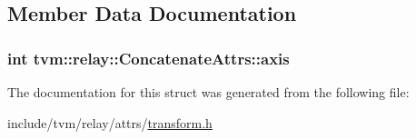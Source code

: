 \subsection{Member Data Documentation}
\subsubsection[{\texorpdfstring{axis}{axis}}]{\setlength{\rightskip}{0pt plus 5cm}int tvm\+::relay\+::\+Concatenate\+Attrs\+::axis}\hypertarget{structtvm_1_1relay_1_1ConcatenateAttrs_adfcdf16b2e6e74b0e88b3886384e8077}{}\label{structtvm_1_1relay_1_1ConcatenateAttrs_adfcdf16b2e6e74b0e88b3886384e8077}


The documentation for this struct was generated from the following file\+:\begin{DoxyCompactItemize}
\item 
include/tvm/relay/attrs/\hyperlink{include_2tvm_2relay_2attrs_2transform_8h}{transform.\+h}\end{DoxyCompactItemize}
